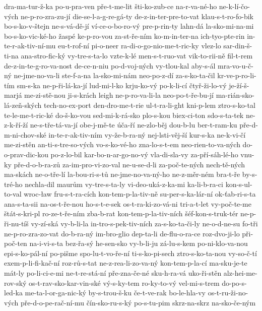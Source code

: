 {dra-ma-tur-ž-ka
po-u-pra-ven
pře-t-me-lit
šti-ko-zub-ce
na-r-va-né-ho
ne-k-lí-čo-vých
ne-p-ro-zra-zu-jí
die-se-l-a-g-re-gá-ty
de-z-in-ter-pre-to-vat
klau-s-t-ro-fo-bik
bo-s-ko-v-štejn
ne-s-vá-dě-jí
ví-ce-o-bo-ro-vý
pre-p-rin-ty
lahn-dá
la-sko-mi-na-mi
bo-s-ko-vic-ké-ho
žaspé
ke-p-ro-vou
za-st-ře-ním
ko-m-in-ter-na
ich-tyo-pte-rin
in-te-r-ak-tiv-ní-mu
eu-t-rof-ní
pi-o-neer
ra-di-o-go-nio-me-t-ric-ky
vlez-lo
sar-din-š-ti-na
ana-stro-fic-ký
vy-tre-s-ta-lo
vzte-k-lé
men-s-t-ruo-vat
vik-to-rii-ně
fil-t-rem
de-z-in-te-g-ro-va-nost
de-ce-n-niu
po-d-voj-ných
vy-tlou-kal
aby-s-ál
mra-vo-u-č-ný
ne-jme-no-va-li
ste-f-a-na
la-sko-mi-nám
neo-po-z-dí
za-s-ko-ta-čil
kr-ve-p-ro-li-tím
sm-s-ka
ne-p-ři-lá-ka-jí
lud-mi-l-ko
krju-ko-vý
po-k-li-cí
čtyř-ži-lo-vý
je-ží-š-marjá
me-zi-stě-nou
ji-s-krách
leigh
ne-p-ro-va-li-la
neo-po-t-ře-bu-jí
ma-rián-sko-lá-zeň-ských
tech-no-ex-port
den-dro-me-t-rie
ul-t-ra-li-ght
kni-p-lem
ztro-s-ko-tal
te-le-me-t-ric-ké
do-š-ko-vou
sed-mi-k-rá-sko
plo-s-kou
biex-ci-ton
sdo-s-ta-tek
ne-z-k-ří-ží
ne-s-tře-tá-va-jí
obe-j-mě-te
úča-ří
ne-zlo-běj
dou-b-lu
ber-t-ram-ku
pře-d-m-ni-chov-ské
in-te-r-ak-tiv-ním
vy-že-b-ra-ný
nej-lsti-věj-ší
kur-s-ka
ne-k-vi-čí
me-zi-stěn
an-ti-s-tre-so-vých
vo-s-ko-vé-ho
zna-lo-s-t-em
neo-rien-to-va-ných
do-o-prav-dic-kou
po-z-lo-bil
kar-bo-n-ar-go-no-vý
vla-di-sla-vy
za-pří-sáh-lé-ho
vnu-ky
pře-d-o-b-ra-zů
za-im-pro-vi-zo-val
ne-u-se-d-li
za-poč-te-ných
nech-tě-ných
ma-skách
ne-o-tře-lí
la-bou-ri-s-tů
ne-jme-no-va-ný-ho
ne-z-měr-ném
bra-t-ře
by-s-tré-ho
nechla-dil
maurům
vy-tre-s-ta-ly
vi-deo-uká-z-ka-mi
ka-li-b-ra-ci
kon-s-ul-to-val
wroc-ław
fru-s-t-ra-cích
kon-tem-p-la-tiv-ně
su-per-s-ka-lár-ní
ok-ťab-ri-s-ta
ana-s-ta-sii
na-os-t-ře-nou
ho-s-t-e-sek
os-t-ra-ki-zo-vá-ni
tri-a-t-let
vy-poč-te-me
štát-s-kri-pl
ro-ze-t-ře-ním
zba-b-rat
kon-tem-p-la-tiv-ních
šéf-kon-s-truk-tér
ne-p-ři-nu-tíš
vy-zí-ská
vy-b-li-la
in-tro-s-pek-tiv-ních
za-s-ko-ta-či-ly
ne-o-d-ne-su
fo-tři
ne-p-ro-zra-zo-vat
do-b-ra-ný
im-bro-glio
dep-ta-li
de-flu-o-ra-ce
roz-dvo-ji-lo
při-poč-ten
na-i-vi-s-ta
bez-řa-sý
he-sen-sko
vy-b-li-ju
zá-lu-s-kem
po-ni-klo-va-nou
epi-s-ko-pál-ní
po-pišme
spo-lu-t-vo-ře-ní
ti-s-ko-pi-sech
ztro-s-ko-ta-nou
vy-so-č-tí
exem-p-li-fi-kač-ní
roz-rů-s-tat
ne-z-rea-li-zo-va-ný
kon-tem-p-la-cí
ma-sku-je-te
mát-ly
po-li-ci-e-mi
ne-t-re-stá-ní
pře-zna-če-né
sku-h-ra-vá
uko-ři-stěn
alz-hei-me-rov-ský
os-t-rav-sko-kar-vin-ské
vý-s-ky-tem
ro-ky-to-vý
vel-mi-s-trem
do-po-s-led-ka
me-ta-l-or-ga-nic-ký
by-s-trou-š-ku
če-t-ve-rak
bo-le-hla-vy
os-t-ru-ži-no-vých
pře-d-o-pe-rač-ní-mu
čín-sko-ru-s-ký
po-s-tu-pim
skrz-na-skrz
na-sko-če-ným
}
